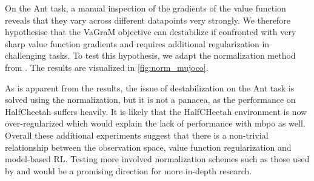 On the Ant task, a manual inspection of the gradients of the value function reveals that they vary across different datapoints very strongly. We therefore hypothesise that the VaGraM objective can destabilize if confronted with very sharp value function gradients and requires additional regularization in challenging tasks. To test this hypothesis, we adapt the normalization method from \textcite{bjorck2022is}. The results are visualized in \autoref{fig:norm_mujoco}.

As is apparent from the results, the issue of destabilization on the Ant task is solved using the normalization, but it is not a panacea, as the performance on HalfCheetah suffers heavily. It is likely that the HalfCHeetah environment is now over-regularized which would explain the lack of performance with \ac{mbpo} as well. Overall these additional experiments suggest that there is a non-trivial relationship between the observation space, value function regularization and model-based RL. Testing more involved normalization schemes such as those used by \textcite{bjorck2021towards} and \textcite{zheng2023is} would be a promising direction for more in-depth research.

